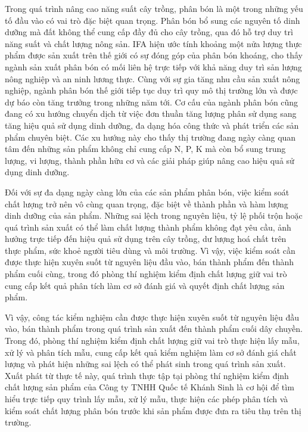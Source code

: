 Trong quá trình nâng cao năng suất cây trồng, phân bón là một trong những yếu tố đầu vào có vai trò đặc biệt quan trọng. 
Phân bón bổ sung các nguyên tố dinh dưỡng mà đất không thể cung cấp đầy đủ cho cây trồng, qua đó hỗ trợ duy trì năng suất và chất lượng nông sản.
IFA hiện ước tính khoảng một nửa lượng thực phẩm được sản xuất trên thế giới có sự đóng góp của phân bón khoáng, cho thấy ngành sản xuất phân bón có mối liên hệ trực tiếp với khả năng duy trì sản lượng nông nghiệp và an ninh lương thực.\cite{ifa-food-nutrition-security}
Cùng với sự gia tăng nhu cầu sản xuất nông nghiệp, ngành phân bón thế giới tiếp tục duy trì quy mô thị trường lớn và được dự báo còn tăng trưởng trong những năm tới.\cite{grand-view-fertilizer-market}
Cơ cấu của ngành phân bón cũng đang có xu hướng chuyển dịch từ việc đơn thuần tăng lượng phân sử dụng sang tăng hiệu quả sử dụng dinh dưỡng, đa dạng hóa công thức và phát triển các sản phẩm chuyên biệt.\cite{fortune-organic-fertilizer-market}
Các xu hướng này cho thấy thị trường đang ngày càng quan tâm đến những sản phẩm không chỉ cung cấp N, P, K mà còn bổ sung trung lượng, vi lượng, thành phần hữu cơ và các giải pháp giúp nâng cao hiệu quả sử dụng dinh dưỡng.\cite{fortune-organic-fertilizer-market}

Đối với sự đa dạng ngày càng lớn của các sản phẩm phân bón, việc kiểm soát chất lượng trở nên vô cùng quan trọng, đặc biệt về thành phần và hàm lượng dinh dưỡng của sản phẩm. 
Những sai lệch trong nguyên liệu, tỷ lệ phối trộn hoặc quá trình sản xuất có thể làm chất lượng thành phẩm không đạt yêu cầu, ảnh hưởng trực tiếp đến hiệu quả sử dụng trên cây trồng, dư lượng hoá chất trên thực phẩm, sức khoẻ người tiêu dùng và môi trường. 
Vì vậy, việc kiểm soát cần được thực hiện xuyên suốt từ nguyên liệu đầu vào, bán thành phẩm đến thành phẩm cuối cùng, trong đó phòng thí nghiệm kiểm định chất lượng giữ vai trò cung cấp kết quả phân tích làm cơ sở đánh giá và quyết định chất lượng sản phẩm.

Vì vậy, công tác kiểm nghiệm cần được thực hiện xuyên suốt từ nguyên liệu đầu vào, bán thành phẩm trong quá trình sản xuất đến thành phẩm cuối dây chuyền. 
Trong đó, phòng thí nghiệm kiểm định chất lượng giữ vai trò thực hiện lấy mẫu, xử lý và phân tích mẫu, cung cấp kết quả kiểm nghiệm làm cơ sở đánh giá chất lượng và phát hiện những sai lệch có thể phát sinh trong quá trình sản xuất. 
Xuất phát từ thực tế này, quá trình thực tập tại phòng thí nghiệm kiểm định chất lượng sản phẩm của Công ty TNHH Quốc tế Khánh Sinh là cơ hội để tìm hiểu trực tiếp quy trình lấy mẫu, xử lý mẫu, thực hiện các phép phân tích và kiểm soát chất lượng phân bón trước khi sản phẩm được đưa ra tiêu thụ trên thị trường.

